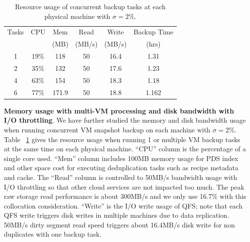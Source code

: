\begin{table}
\begin{small}
    \begin{tabular}{|c|c|c|c|c|c|}
    \hline
    Tasks & CPU & Mem &Read &  Write  & Backup Time  \\ 
    & & (MB)          &(MB/s) &  (MB/s) & (hrs) \\ \hline
    1     & 19\% & 118 & 50 & 16.4 & 1.31\\ \hline
    2     & 35\% & 132 &50  & 17.6 & 1.23\\ \hline
    4     & 63\% & 154&50   & 18.3 & 1.18\\ \hline
    6     & 77\% & 171.9 & 50 &  18.8 & 1.162\\ \hline
    \end{tabular}
\end{small}
\caption{Resource usage of concurrent backup tasks at each physical machine with $\sigma=2\%$.}
\label{tab:resource_usage}
\end{table}

{\bf Memory usage with multi-VM processing and disk bandwidth with  I/O throttling}. 
We have further studied the memory and disk bandwidth usage 
when running concurrent VM snapshot backup on each machine with $\sigma=2\%$. 
Table ~\ref{tab:resource_usage} gives the resource usage  when
running 1 or multiple  VM backup tasks at the same time on each physical machine. 
``CPU'' column is the percentage of a single core used. 
``Mem'' column includes 100MB memory usage for PDS index and other space cost for executing deduplication tasks such as 
recipe metadata and cache. 
The ``Read'' column is controlled to 50MB/s bandwidth usage with I/O throttling so that other cloud services are not impacted too much.
The peak raw storage read performance is about 300MB/s and we only use 16.7\% with this collocation consideration.
``Write'' is the I/O write usage of QFS; note that each QFS write triggers disk writes in multiple machines due to
data replication.     50MB/s dirty segment read speed triggers about 16.4MB/s disk write for non duplicates with one backup task.

